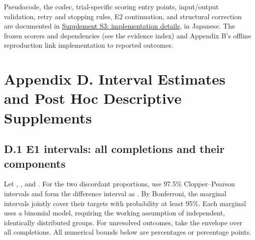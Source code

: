 \documentclass[10pt,a4paper]{article}
\begin{document}
Pseudocode, the codec, trial-specific scoring entry points, input/output validation, retry and stopping rules, E2 continuation, and structural correction are documented in \href{https://github.com/metaSATOKEN/MRSI/blob/9443de315d283874df0c27e0e99b8c04f400709d/papers/paper-01/implementation-notes-v0.3-2026-09-23.md}{Supplement S3: implementation details}, in Japanese. The frozen scorers and dependencies (see the evidence index) and Appendix B's offline reproduction link implementation to reported outcomes.

\section{Appendix D. Interval Estimates and Post Hoc Descriptive Supplements}\label{paper-01-appendix-d.-interval-estimates-and-post-hoc-descriptive-supplements}

\subsection{D.1 E1 intervals: all completions and their components}\label{paper-01-d.1-e1-intervals-all-completions-and-their-components}

Let \texttt{}, \texttt{}, and \texttt{}. For the two discordant proportions, use 97.5\% Clopper--Pearson intervals and form the difference interval as \texttt{\seqsplit{[La−Ub, Ua−Lb]}}. By Bonferroni, the marginal intervals jointly cover their targets with probability at least 95\%. Each marginal uses a binomial model, requiring the working assumption of independent, identically distributed groups. For unresolved outcomes, take the envelope over all completions. All numerical bounds below are percentages or percentage points.
\end{document}
